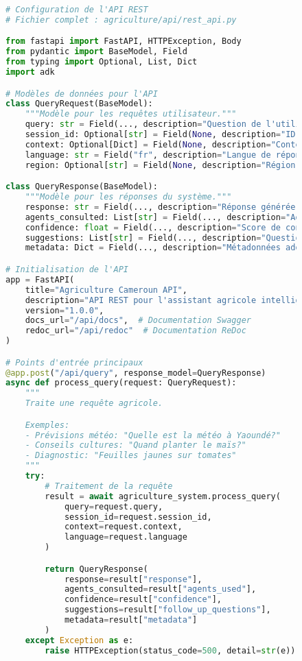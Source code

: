 \begin{figure}[h]
\centering
\begin{lstlisting}[language=Python, caption=Points d'entrée de l'API REST]
# Configuration de l'API REST
# Fichier complet : agriculture/api/rest_api.py

from fastapi import FastAPI, HTTPException, Body
from pydantic import BaseModel, Field
from typing import Optional, List, Dict
import adk

# Modèles de données pour l'API
class QueryRequest(BaseModel):
    """Modèle pour les requêtes utilisateur."""
    query: str = Field(..., description="Question de l'utilisateur")
    session_id: Optional[str] = Field(None, description="ID de session")
    context: Optional[Dict] = Field(None, description="Contexte additionnel")
    language: str = Field("fr", description="Langue de réponse")
    region: Optional[str] = Field(None, description="Région spécifique")

class QueryResponse(BaseModel):
    """Modèle pour les réponses du système."""
    response: str = Field(..., description="Réponse générée")
    agents_consulted: List[str] = Field(..., description="Agents consultés")
    confidence: float = Field(..., description="Score de confiance")
    suggestions: List[str] = Field(..., description="Questions suggérées")
    metadata: Dict = Field(..., description="Métadonnées additionnelles")

# Initialisation de l'API
app = FastAPI(
    title="Agriculture Cameroun API",
    description="API REST pour l'assistant agricole intelligent",
    version="1.0.0",
    docs_url="/api/docs",  # Documentation Swagger
    redoc_url="/api/redoc"  # Documentation ReDoc
)

# Points d'entrée principaux
@app.post("/api/query", response_model=QueryResponse)
async def process_query(request: QueryRequest):
    """
    Traite une requête agricole.

    Exemples:
    - Prévisions météo: "Quelle est la météo à Yaoundé?"
    - Conseils cultures: "Quand planter le maïs?"
    - Diagnostic: "Feuilles jaunes sur tomates"
    """
    try:
        # Traitement de la requête
        result = await agriculture_system.process_query(
            query=request.query,
            session_id=request.session_id,
            context=request.context,
            language=request.language
        )

        return QueryResponse(
            response=result["response"],
            agents_consulted=result["agents_used"],
            confidence=result["confidence"],
            suggestions=result["follow_up_questions"],
            metadata=result["metadata"]
        )
    except Exception as e:
        raise HTTPException(status_code=500, detail=str(e))


\end{lstlisting}
\end{figure}
